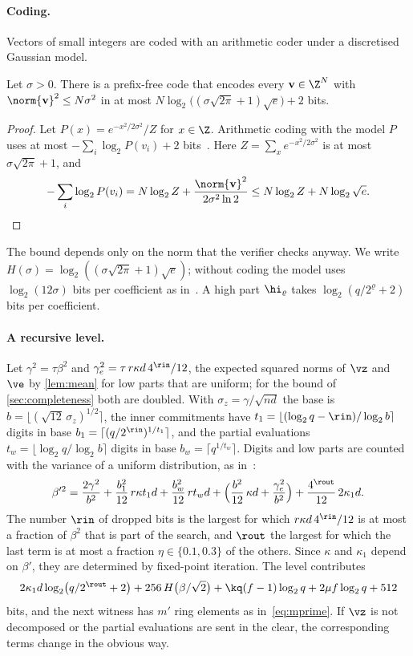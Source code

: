 \paragraph{Coding.}
Vectors of small integers are coded with an arithmetic coder under a discretised Gaussian model.
\begin{lemma}\label{lem:coding}
Let $\sigma>0$. There is a prefix-free code that encodes every $\mathbf v\in\Z^N$ with $\norm{\mathbf v}^2\le N\sigma^2$ in at most $N\log_2\bigl((\sigma\sqrt{2\pi}+1)\sqrt e\bigr)+2$ bits.
\end{lemma}
\begin{proof}
Let $P(x)=e^{-x^2/2\sigma^2}/Z$ for $x\in\Z$. Arithmetic coding with the model $P$ uses at most $-\sum_i\log_2P(v_i)+2$ bits~\cite{WNC87}. Here $Z=\sum_xe^{-x^2/2\sigma^2}$ is at most $\sigma\sqrt{2\pi}+1$, and
\[
-\sum_i\log_2P(v_i)=N\log_2Z+\frac{\norm{\mathbf v}^2}{2\sigma^2\ln2}\le N\log_2Z+N\log_2\sqrt e .\qedhere
\]
\end{proof}
The bound depends only on the norm that the verifier checks anyway. We write $H(\sigma)=\log_2((\sigma\sqrt{2\pi}+1)\sqrt e)$; without coding the model uses $\log_2(12\sigma)$ bits per coefficient as in~\cite{BS23}. A high part $\hi_\varrho$ takes $\log_2(q/2^\varrho+2)$ bits per coefficient.

\paragraph{A recursive level.}
Let $\gamma^2=\tau\beta^2$ and $\gamma_e^2=\tau\,r\kappa d\,4^{\rin}/12$, the expected squared norms of $\vz$ and $\ve$ by \cref{lem:mean} for low parts that are uniform; for the bound of \cref{sec:completeness} both are doubled. With $\sigma_z=\gamma/\sqrt{nd}$ the base is $b=\lfloor(\sqrt{12}\,\sigma_z)^{1/2}\rceil$, the inner commitments have $t_1=\lfloor(\log_2q-\rin)/\log_2b\rceil$ digits in base $b_1=\lceil(q/2^{\rin})^{1/t_1}\rceil$, and the partial evaluations $t_w=\lfloor\log_2q/\log_2b\rceil$ digits in base $b_w=\lceil q^{1/t_w}\rceil$. Digits and low parts are counted with the variance of a uniform distribution, as in~\cite{BS23}:
\[
\beta'^2=\frac{2\gamma^2}{b^2}+\frac{b_1^2}{12}\,r\kappa t_1d+\frac{b_w^2}{12}\,rt_wd+\Bigl(\frac{b^2}{12}\,\kappa d+\frac{\gamma_e^2}{b^2}\Bigr)+\frac{4^{\rout}}{12}\,2\kappa_1d .
\]
The number $\rin$ of dropped bits is the largest for which $r\kappa d\,4^{\rin}/12$ is at most a fraction of $\beta^2$ that is part of the search, and $\rout$ the largest for which the last term is at most a fraction $\eta\in\{0.1,0.3\}$ of the others. Since $\kappa$ and $\kappa_1$ depend on $\beta'$, they are determined by fixed-point iteration. The level contributes
\[
2\kappa_1d\log_2\bigl(q/2^{\rout}+2\bigr)+256\,H\bigl(\beta/\sqrt2\bigr)+\kq(f-1)\log_2q+2\mu f\log_2q+512
\]
bits, and the next witness has $m'$ ring elements as in~\eqref{eq:mprime}. If $\vz$ is not decomposed or the partial evaluations are sent in the clear, the corresponding terms change in the obvious way.

